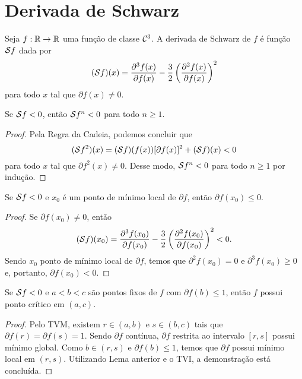 \section{Derivada de Schwarz}

\begin{definition}
Seja $f: \mathbb{R} \to \mathbb{R}$ uma função de classe $\mathcal{C}^3$.
A derivada de Schwarz de $f$ é função $\mathcal{S} f$ dada por
$$(\mathcal{S} f)(x) = \frac{\partial^3 f(x)}{\partial f(x)} - \frac{3}{2} \left( \frac{\partial^2 f(x)}{\partial f(x)} \right)^2$$
para todo $x$ tal que $\partial f(x) \neq 0$.
\end{definition}

\begin{proposition}
Se $\mathcal{S} f < 0$, então $\mathcal{S} f^n < 0$ para todo $n \geq 1$.
\end{proposition}

\begin{proof}
Pela Regra da Cadeia, podemos concluir que
$$(\mathcal{S} f^2)(x) = (\mathcal{S} f)(f(x)) [\partial f(x)]^2 + (\mathcal{S} f)(x) < 0$$
para todo $x$ tal que $\partial f^2(x) \neq 0$.
Desse modo, $\mathcal{S} f^n < 0$ para todo $n \geq 1$ por indução.
\end{proof}

\begin{lemma}
\label{lemma1}
Se $\mathcal{S} f < 0$ e $x_0$ é um ponto de mínimo local de $\partial f$, então $\partial f(x_0) \leq 0$.
\end{lemma}

\begin{proof}
Se $\partial f(x_0) \neq 0$, então
$$(\mathcal{S} f)(x_0) = \frac{\partial^3 f(x_0)}{\partial f(x_0)} - \frac{3}{2} \left( \frac{\partial^2 f(x_0)}{\partial f(x_0)} \right)^2 < 0.$$
Sendo $x_0$ ponto de mínimo local de $\partial f$, temos que $\partial^2 f(x_0) = 0$ e $\partial^3 f(x_0) \geq 0$ e, portanto, $\partial f(x_0) < 0$. 
\end{proof}

\begin{lemma}
\label{lemma2}
Se $\mathcal{S} f < 0$ e $a<b<c$ são pontos fixos de $f$ com $\partial f(b) \leq 1$, então $f$ possui ponto crítico em $(a, c)$.
\end{lemma}

\begin{proof}
Pelo TVM, existem $r \in (a,b)$ e $s \in (b,c)$  tais que $\partial f(r) = \partial f(s) = 1$. Sendo $\partial f$ contínua, $\partial f$ restrita ao intervalo $[r,s]$ possui mínimo global. Como $b \in (r,s)$ e $\partial f(b) \leq 1$, temos que $\partial f$ possui mínimo local em $(r,s)$. Utilizando Lema anterior e o TVI, a demonstração está concluída.
\end{proof}

